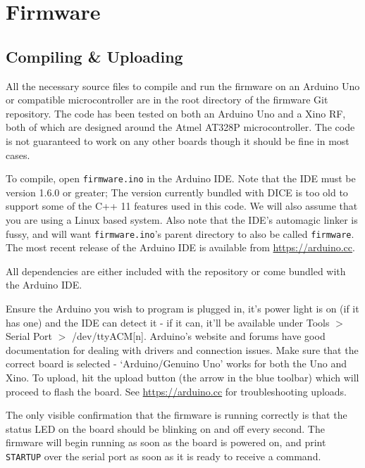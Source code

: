 %
%

\section{Firmware}

\subsection{Compiling \& Uploading}

All the necessary source files to compile and run the firmware on an Arduino Uno or compatible microcontroller are in the root directory of the firmware Git repository. The code has been tested on both an Arduino Uno and a Xino RF, both of which are designed around the Atmel AT328P microcontroller. The code is not guaranteed to work on any other boards though it should be fine in most cases.

To compile, open \texttt{firmware.ino} in the Arduino IDE. Note that the IDE must be version 1.6.0 or greater; The version currently bundled with DICE is too old to support some of the C++ 11 features used in this code. We will also assume that you are using a Linux based system. Also note that the IDE's automagic linker is fussy, and will want \texttt{firmware.ino}'s parent directory to also be called \texttt{firmware}. The most recent release of the Arduino IDE is available from \href{https://arduino.cc}{https://arduino.cc}.

All dependencies are either included with the repository or come bundled with the Arduino IDE.

Ensure the Arduino you wish to program is plugged in, it's power light is on (if it has one) and the IDE can detect it - if it can, it'll be available under Tools $>$ Serial Port $>$ /dev/ttyACM[n]. Arduino's website and forums have good documentation for dealing with drivers and connection issues. Make sure that the correct board is selected - `Arduino/Genuino Uno' works for both the Uno and Xino. To upload, hit the upload button (the arrow in the blue toolbar) which will proceed to flash the board. See \href{https://www.arduino.cc/en/Guide/Troubleshooting}{https://arduino.cc} for troubleshooting uploads.

The only visible confirmation that the firmware is running correctly is that the status LED on the board should be blinking on and off every second. The firmware will begin running as soon as the board is powered on, and print \verb|STARTUP| over the serial port as soon as it is ready to receive a command.

